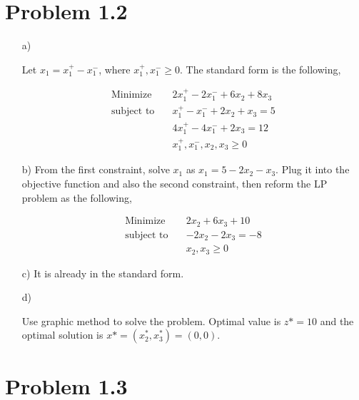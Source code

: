 \documentclass[12pt]{article}
\begin{document}
\section*{Problem 1.2}
\begin{enumerate}
\item[a)]

Let $x_1 = x_1^+ - x_1^-$, where $x_1^+, x_1^- \geqslant 0$. The standard form is the following,

\begin{equation*}
\begin{aligned}
\text{Minimize} \quad & 2x_1^+ - 2x_1^- + 6x_2 + 8x_3 \\
\text{subject\  to} \quad & x_1^+ - x_1^- + 2x_2 + x_3 = 5 \\
& 4x_1^+ - 4x_1^-  + 2x_3 = 12\\
& x_1^+, x_1^-, x_2, x_3 \geqslant 0
\end{aligned}
\end{equation*}

\item[b)]
From the first constraint, solve $x_1$ as $x_1 = 5 - 2x_2 - x_3$. Plug it into the objective function and also the second constraint, then reform the LP problem as the following,

\begin{equation*}
\begin{aligned}
\text{Minimize} \quad & 2x_2 + 6x_3 +10\\
\text{subject\  to} \quad & -2x_2 - 2x_3 = -8 \\
& x_2, x_3 \geqslant 0
\end{aligned}
\end{equation*}

\item[c)]
It is already in the standard form.

\item[d)]

Use graphic method to solve the problem. Optimal value is $z* = 10$ and the optimal solution is $x* = (x_2^*, x_3^*) = (0, 0)$.
\end{enumerate}


\section*{Problem 1.3}
\end{document}
